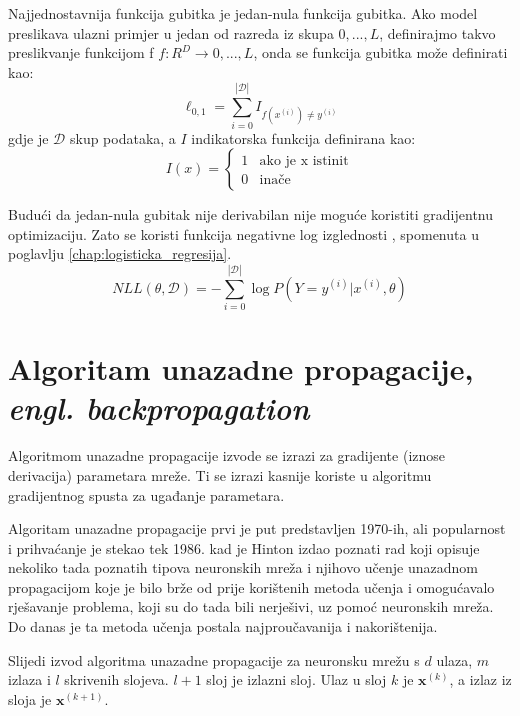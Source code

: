 \documentclass[times, utf8, diplomski, numeric]{fer}
\newcommand{\abs}[1]{\left\lvert#1\right\rvert}
\begin{document}
Najjednostavnija funkcija gubitka je jedan-nula funkcija gubitka. Ako model preslikava ulazni primjer u jedan od razreda iz skupa ${0, ..., L}$, definirajmo takvo preslikvanje funkcijom f $f: R^D \rightarrow {0, ..., L}$, onda se funkcija gubitka može definirati kao:
\begin{equation}
\ell_{0, 1} = \sum_{i = 0}^{\abs{\mathcal{D}}} I_{f(x^{(i)}) \neq y^{(i)}}
\end{equation}
gdje je $\mathcal{D}$ skup podataka, a $I$ indikatorska funkcija definirana kao:
\begin{equation}
I(x) =
    \left\{
	    \begin{array}{ll}
		    1  & \mbox{ako je x istinit} \\
		    0  & \mbox{inače}
	    \end{array}
    \right.
\end{equation}

Budući da jedan-nula gubitak nije derivabilan nije moguće koristiti gradijentnu optimizaciju. Zato se koristi funkcija negativne log izglednosti , spomenuta u poglavlju \ref{chap:logisticka_regresija}.
\begin{equation}
NLL(\theta, \mathcal{D}) = - \sum_{i = 0}^{\abs{\mathcal{D}}} \log P(Y = y^{(i)} | x^{(i)}, \theta)
\end{equation}


\section{Algoritam unazadne propagacije, \emph{engl. backpropagation}}

Algoritmom unazadne propagacije izvode se izrazi za gradijente (iznose derivacija) parametara mreže. Ti se izrazi kasnije koriste u algoritmu gradijentnog spusta za ugađanje parametara.

Algoritam unazadne propagacije prvi je put predstavljen 1970-ih, ali popularnost i prihvaćanje je stekao tek 1986. kad je Hinton izdao poznati rad koji opisuje nekoliko tada poznatih tipova neuronskih mreža i njihovo učenje unazadnom propagacijom koje je bilo brže od prije korištenih metoda učenja i omogućavalo rješavanje problema, koji su do tada bili nerješivi, uz pomoć neuronskih mreža. Do danas je ta metoda učenja postala najproučavanija i nakorištenija.

Slijedi izvod algoritma unazadne propagacije za neuronsku mrežu s $d$ ulaza, $m$ izlaza i $l$ skrivenih slojeva. $l+1$ sloj je izlazni sloj.
Ulaz u sloj $k$ je $\boldsymbol{x}^{(k)}$, a izlaz iz sloja je $\boldsymbol{x}^{(k+1)}$.
\end{document}
